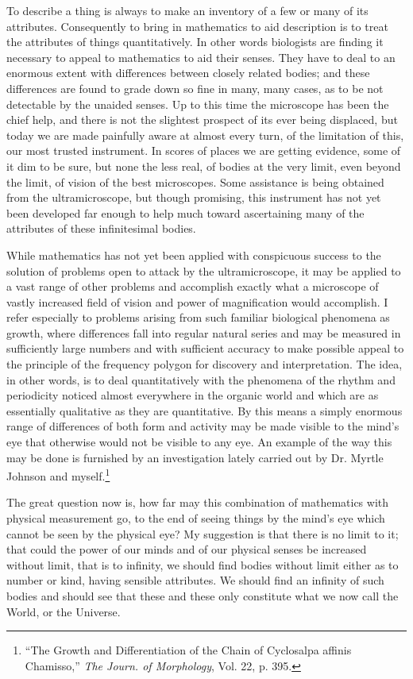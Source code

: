 \documentclass[a4paper, 11pt, oneside, polutonikogreek, english]{article}
\begin{document}
To describe a thing is always to make an inventory of a few or many of its attributes. Consequently to bring in mathematics to aid description is to treat the attributes of things quantitatively. In other words biologists are finding it necessary to appeal to mathematics to aid their senses. They have to deal to an enormous extent with differences between closely related bodies; and these differences are found to grade down so fine in many, many cases, as to be not detectable by the unaided senses. Up to this time the microscope has been the chief help, and there is not the slightest prospect of its ever being displaced, but today we are made painfully aware at almost every turn, of the limitation of this, our most trusted instrument. In scores of places we are getting evidence, some of it dim to be sure, but none the less real, of bodies at the very limit, even beyond the limit, of vision of the best microscopes. Some assistance is being obtained from the ultramicroscope, but though promising, this instrument has not yet been developed far enough to help much toward ascertaining many of the attributes of these infinitesimal bodies.

While mathematics has not yet been applied with conspicuous success to the solution of problems open to attack by the ultramicroscope, it may be applied to a vast range of other problems and accomplish exactly what a microscope of vastly increased field of vision and power of magnification would accomplish. I refer especially to problems arising from such familiar biological phenomena as growth, where differences fall into regular natural series and may be measured in sufficiently large numbers and with sufficient accuracy to make possible appeal to the principle of the frequency polygon for discovery and interpretation. The idea, in other words, is to deal quantitatively with the phenomena of the rhythm and periodicity noticed almost everywhere in the organic world and which are as essentially qualitative as they are quantitative. By this means a simply enormous range of differences of both form and activity may be made visible to the mind's eye that otherwise would not be visible to any eye. An example of the way this may be done is furnished by an investigation lately carried out by Dr. Myrtle Johnson and myself.\footnote{``The Growth and Differentiation of the Chain of Cyclosalpa affinis Chamisso,'' \emph{The Journ. of Morphology}, Vol. 22, p. 395.}

The great question now is, how far may this combination of mathematics with physical measurement go, to the end of seeing things by the mind's eye which cannot be seen by the physical eye? My suggestion is that there is no limit to it; that could the power of our minds and of our physical senses be increased without limit, that is to infinity, we should find bodies without limit either as to number or kind, having sensible attributes. We should find an infinity of such bodies and should see that these and these only constitute what we now call the World, or the Universe.
\end{document}
